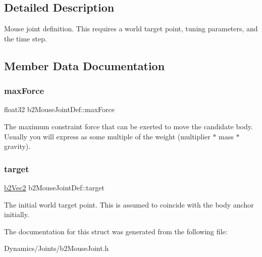 \subsection{Detailed Description}
Mouse joint definition. This requires a world target point, tuning parameters, and the time step. 

\subsection{Member Data Documentation}
\mbox{\label{structb2MouseJointDef_ae9c52b3afda8ed006eb62fad163cdc3b}} 
\subsubsection{\texorpdfstring{max\+Force}{maxForce}}
{\footnotesize\ttfamily float32 b2\+Mouse\+Joint\+Def\+::max\+Force}

The maximum constraint force that can be exerted to move the candidate body. Usually you will express as some multiple of the weight (multiplier $\ast$ mass $\ast$ gravity). \mbox{\label{structb2MouseJointDef_aa1b76f72df9aca8d42bdc3e9922e310a}} 
\subsubsection{\texorpdfstring{target}{target}}
{\footnotesize\ttfamily \mbox{\hyperlink{structb2Vec2}{b2\+Vec2}} b2\+Mouse\+Joint\+Def\+::target}

The initial world target point. This is assumed to coincide with the body anchor initially. 

The documentation for this struct was generated from the following file\+:\begin{DoxyCompactItemize}
\item 
Dynamics/\+Joints/b2\+Mouse\+Joint.\+h\end{DoxyCompactItemize}
